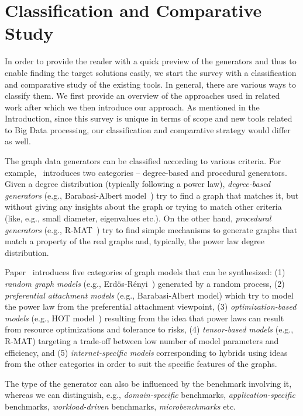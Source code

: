 \section{Classification and Comparative Study}
\label{sec:comparison}

In order to provide the reader with a quick preview of the generators and thus to enable finding the target solutions easily, we start the survey with a  classification and comparative study of the existing tools. In general, there are various ways to classify them. We first provide an overview of the approaches used in related work after which we then introduce our approach. As mentioned in the Introduction, since this survey is unique in terms of scope and new tools related to Big Data processing, our classification and comparative strategy would differ as well.

The graph data generators can be classified according to various criteria. For example,~\cite{DBLP:conf/sdm/ChakrabartiZF04} introduces two categories -- degree-based and procedural generators. Given a degree distribution (typically following a power law), \emph{degree-based generators} (e.g., Barabasi-Albert model~\cite{Barabasi99emergenceScaling}) try to find a graph that matches it, but without giving any insights about the graph or trying to match other criteria (like, e.g., small diameter, eigenvalues etc.). On the other hand, \emph{procedural generators} (e.g., R-MAT~\cite{DBLP:conf/sdm/ChakrabartiZF04}) try to find simple mechanisms to generate graphs that match a property of the real graphs and, typically, the power law degree distribution.

Paper~\cite{Chakrabarti:2006:GML:1132952.1132954} introduces five categories of graph models that can be synthesized: (1) \emph{random graph models} (e.g., Erd\"{o}s-R\'{e}nyi~\cite{Erdos:1960}) generated by a random process, (2) \emph{preferential attachment models} (e.g., Barabasi-Albert model) which try to model the power law from the preferential attachment viewpoint, (3) \emph{optimization-based models} (e.g., HOT model~\cite{PhysRevLett.84.2529}) resulting from the idea that power laws can result from resource optimizations and tolerance to risks, (4) \emph{tensor-based models} (e.g., R-MAT) targeting a trade-off between low number of model parameters and efficiency, and (5) \emph{internet-specific models} corresponding to hybrids using ideas from the other categories in order to suit the specific features of the graphs.

The type of the generator can also be influenced by the benchmark involving it, whereas we can distinguish, e.g., \emph{domain-specific} benchmarks, \emph{application-specific} benchmarks, \emph{workload-driven} benchmarks,  \emph{microbenchmarks} etc.


